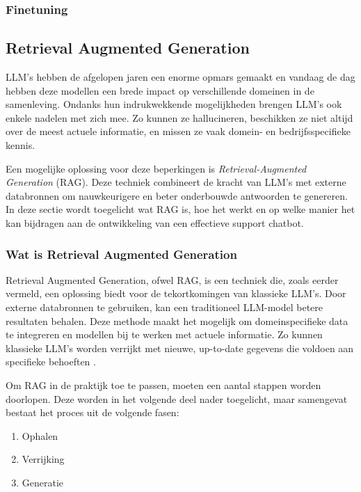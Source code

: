     \subsubsection{Finetuning}
     
     
    \subsection{Retrieval Augmented Generation}
    
    LLM's hebben de afgelopen jaren een enorme opmars gemaakt en vandaag de dag hebben deze modellen een brede impact op verschillende domeinen in de samenleving. Ondanks hun indrukwekkende mogelijkheden brengen LLM’s ook enkele nadelen met zich mee. Zo kunnen ze hallucineren, beschikken ze niet altijd over de meest actuele informatie, en missen ze vaak domein- en bedrijfsspecifieke kennis. %
    
    Een mogelijke oplossing voor deze beperkingen is \textit{Retrieval-Augmented Generation} (RAG). Deze techniek combineert de kracht van LLM’s met externe databronnen om nauwkeurigere en beter onderbouwde antwoorden te genereren. In deze sectie wordt toegelicht wat RAG is, hoe het werkt en op welke manier het kan bijdragen aan de ontwikkeling van een effectieve support chatbot.
    
    \subsubsection{Wat is Retrieval Augmented Generation}
    Retrieval Augmented Generation, ofwel RAG, is een techniek die, zoals eerder vermeld, een oplossing biedt voor de tekortkomingen van klassieke LLM’s. Door externe databronnen te gebruiken, kan een traditioneel LLM-model betere resultaten behalen. Deze methode maakt het mogelijk om domeinspecifieke data te integreren en modellen bij te werken met actuele informatie. Zo kunnen klassieke LLM’s worden verrijkt met nieuwe, up-to-date gegevens die voldoen aan specifieke behoeften \autocite{wu2025retrievalaugmentedgenerationnaturallanguage}.
    
    Om RAG in de praktijk toe te passen, moeten een aantal stappen worden doorlopen. Deze worden in het volgende deel nader toegelicht, maar samengevat bestaat het proces uit de volgende fasen:
    
    \begin{enumerate}
        \item {Ophalen}
        \item {Verrijking}
        \item {Generatie}
    \end{enumerate}
    
